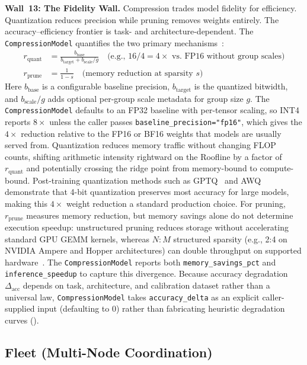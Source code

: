 \documentclass[10pt,twocolumn]{article}
\begin{document}
\textbf{Wall~13: The Fidelity Wall.} Compression trades model fidelity for efficiency. Quantization reduces precision while pruning removes weights entirely. The accuracy--efficiency frontier is task- and architecture-dependent. The \texttt{CompressionModel} quantifies the two primary mechanisms~\citep{han2016deep, gholami2022}:
\begin{align}
\label{eq:compression}
r_{\text{quant}} &= \frac{b_{\text{base}}}{b_{\text{target}} + b_{\text{scale}} / g} \quad \text{(e.g., } 16/4 = 4{\times}\text{ vs.\ FP16 without group scales)} \\
r_{\text{prune}} &= \frac{1}{1 - s} \quad \text{(memory reduction at sparsity } s\text{)}
\end{align}
Here $b_{\text{base}}$ is a configurable baseline precision, $b_{\text{target}}$ is the quantized bitwidth, and $b_{\text{scale}}/g$ adds optional per-group scale metadata for group size $g$. The \texttt{CompressionModel} defaults to an FP32 baseline with per-tensor scaling, so INT4 reports $8{\times}$ unless the caller passes \texttt{baseline\_precision="fp16"}, which gives the $4{\times}$ reduction relative to the FP16 or BF16 weights that models are usually served from. Quantization reduces memory traffic without changing FLOP counts, shifting arithmetic intensity rightward on the Roofline by a factor of $r_{\text{quant}}$ and potentially crossing the ridge point from memory-bound to compute-bound. Post-training quantization methods such as GPTQ~\citep{frantar2023gptq} and AWQ~\citep{lin2025} demonstrate that 4-bit quantization preserves most accuracy for large models, making this $4{\times}$ weight reduction a standard production choice. For pruning, $r_{\text{prune}}$ measures memory reduction, but memory savings alone do not determine execution speedup: unstructured pruning reduces storage without accelerating standard GPU GEMM kernels, whereas $N{:}M$ structured sparsity (e.g., 2:4 on NVIDIA Ampere and Hopper architectures) can double throughput on supported hardware~\citep{nvidia2023h100}. The \texttt{CompressionModel} reports both \texttt{memory\_savings\_pct} and \texttt{inference\_speedup} to capture this divergence. Because accuracy degradation $\Delta_{\text{acc}}$ depends on task, architecture, and calibration dataset rather than a universal law, \texttt{CompressionModel} takes \texttt{accuracy\_delta} as an explicit caller-supplied input (defaulting to $0$) rather than fabricating heuristic degradation curves ().

\subsection{Fleet (Multi-Node Coordination)}
\label{sec:walls-fleet}
\end{document}
